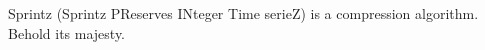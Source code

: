 \documentclass{vldb}
\begin{document}
Sprintz (Sprintz PReserves INteger Time serieZ) is a compression algorithm. Behold its majesty.

\vspace{-1mm}


% 


\end{document}
